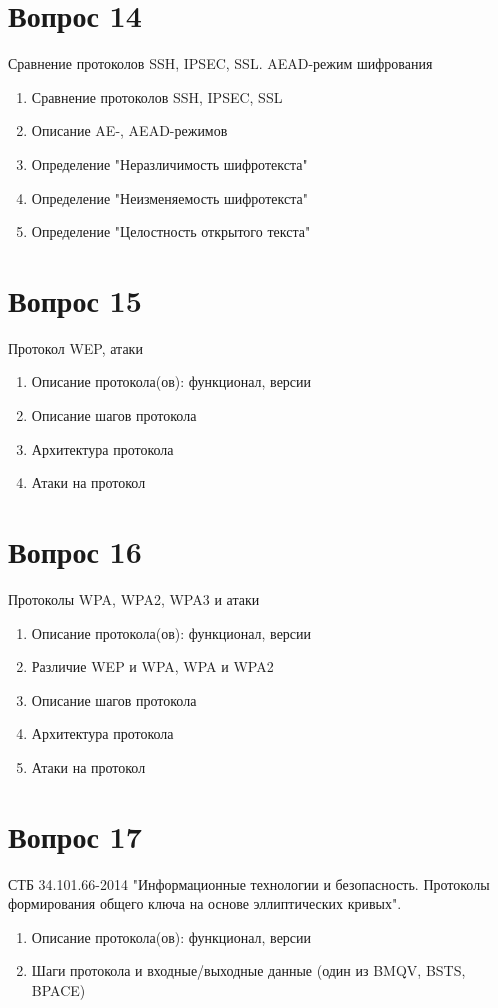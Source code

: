\documentclass[a4paper,12pt]{article}
\begin{document}
	\section{Вопрос 14}
	Сравнение протоколов SSH, IPSEC, SSL. AEAD-режим шифрования
	\begin{enumerate}
		\item Сравнение протоколов SSH, IPSEC, SSL
		\item Описание AE-, AEAD-режимов
		\item Определение "Неразличимость шифротекста"
		\item Определение "Неизменяемость шифротекста"
		\item Определение "Целостность открытого текста"
	\end{enumerate}
	\newpage
	
	\section{Вопрос 15}
	Протокол WEP, атаки
	\begin{enumerate}
		\item Описание протокола(ов): функционал, версии
		\item Описание шагов протокола
		\item Архитектура протокола
		\item Атаки на протокол
	\end{enumerate}
	\newpage
	
	\section{Вопрос 16}
	Протоколы WPA, WPA2, WPA3 и атаки
	\begin{enumerate}
		\item Описание протокола(ов): функционал, версии
		\item Различие WEP и WPA, WPA и WPA2
		\item Описание шагов протокола
		\item Архитектура протокола
		\item Атаки на протокол
	\end{enumerate}
	\newpage
	
	\section{Вопрос 17}
	СТБ 34.101.66-2014 "Информационные технологии и безопасность. Протоколы формирования общего ключа на основе эллиптических кривых".
	\begin{enumerate}
		\item Описание протокола(ов): функционал, версии
		\item Шаги протокола и входные/выходные данные (один из BMQV, BSTS, BPACE)
	\end{enumerate}
	\newpage
	
\end{document}
